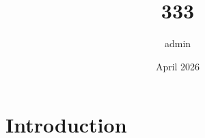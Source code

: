 \documentclass{article}
\title{333}
\author{admin }
\date{April 2026}
\begin{document}
\maketitle

\section{Introduction}
\end{document}
